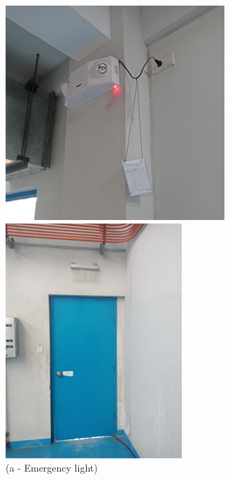 \begin{figure}[!h]
	
	\begin{minipage}[b]{0.22\linewidth}
		\centering
		\includegraphics[width=\textwidth]{figures/ch04_fig_safety03}
		\caption*{(a - Emergency light)}
	\end{minipage}
	\hspace{0.03cm}
	\begin{minipage}[b]{0.22\linewidth}
		\centering
		\includegraphics[width=\textwidth]{figures/ch04_fig_safety04}

\end{minipage}
\end{figure}
